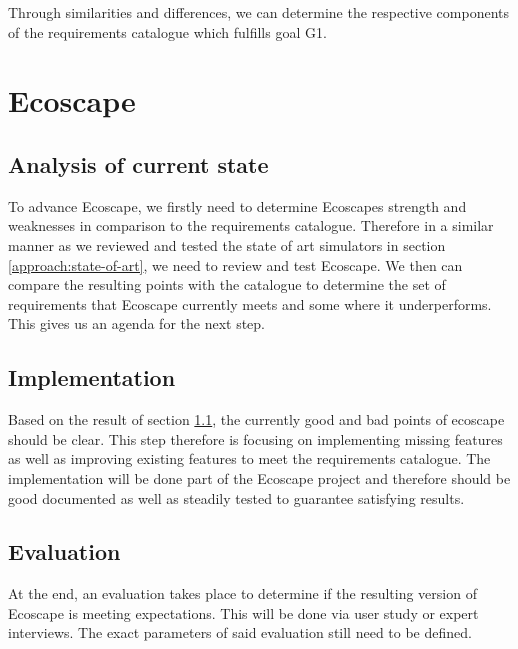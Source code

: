 Through similarities and differences, we can determine the respective components of the requirements catalogue which fulfills goal G1.

\section{Ecoscape}\label{approach:ecoscape}
\subsection{Analysis of current state}\label{approach:ecoscape-current-state}
To advance Ecoscape, we firstly need to determine Ecoscapes strength and weaknesses in comparison to the requirements catalogue. 
Therefore in a similar manner as we reviewed and tested the state of art simulators in section \ref{approach:state-of-art}, we need to review and test Ecoscape.
We then can compare the resulting points with the catalogue to determine the set of requirements that Ecoscape currently meets and some where it underperforms.
This gives us an agenda for the next step.

\subsection{Implementation}\label{approach:ecoscape-implementation}
Based on the result of section \ref{approach:ecoscape-current-state}, the currently good and bad points of ecoscape should be clear. This step therefore is focusing on implementing missing features as well as improving existing features 
to meet the requirements catalogue.
The implementation will be done part of the Ecoscape project and therefore should be good documented as well as steadily tested to guarantee satisfying results. 

\subsection{Evaluation}\label{approach:ecoscape-evaluation}
At the end, an evaluation takes place to determine if the resulting version of Ecoscape is meeting expectations. This will be done via user study or expert interviews.
The exact parameters of said evaluation still need to be defined.